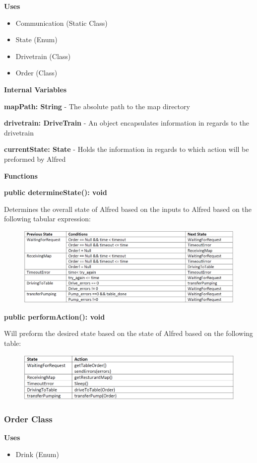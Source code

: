 \documentclass [10pt]{article}
\begin{document}
\textbf{Uses}
\begin{itemize}
	\item Communication (Static Class)
	\item State (Enum)
	\item Drivetrain (Class)
	\item Order (Class)
\end{itemize}


\textbf{Internal Variables}

\textbf{mapPath: String} - The absolute path to the map directory

\textbf{drivetrain: DriveTrain} - An object encapsulates information in regards to the drivetrain

\textbf{currentState: State} - Holds the information in regards to which action will be preformed by Alfred


\textbf{Functions}

\textbf{public determineState(): void}

Determines the overall state of Alfred based on the inputs to Alfred based on the following tabular expression:
\begin{figure} [h!]
	\centering
	\includegraphics [scale = 0.4] {figures/AlfredSystem_DetermineState.png}
\end{figure}


\textbf{public performAction(): void}

Will preform the desired state based on the state of Alfred based on the following table:
\begin{figure} [h!]
	\centering
	\includegraphics [scale = 0.4] {figures/AlfredSystem_PerformAction.png}
\end{figure}
\subsubsection{Order Class}
\textbf{Uses}
\begin{itemize}
	\item Drink (Enum)
\end{itemize}
\end{document}
